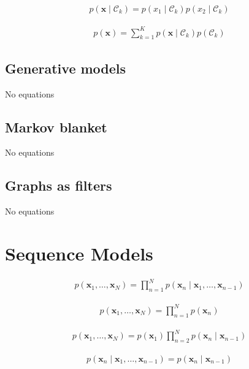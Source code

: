 \documentclass{article}
\begin{document}
\begin{align*}
p\left(\mathbf{x} \mid \mathcal{C}_{k}\right)=p\left(x_{1} \mid \mathcal{C}_{k}\right) p\left(x_{2} \mid \mathcal{C}_{k}\right) 
\tag{11.40}
\end{align*}

\begin{align*}
p(\mathbf{x})=\sum_{k=1}^{K} p\left(\mathbf{x} \mid \mathcal{C}_{k}\right) p\left(\mathcal{C}_{k}\right) 
\tag{11.41}
\end{align*}

\subsection{Generative models}

No equations

\subsection{Markov blanket}

No equations

\subsection{Graphs as filters}

No equations

\section{Sequence Models}

\begin{align*}
p\left(\mathbf{x}_{1}, \ldots, \mathbf{x}_{N}\right)=\prod_{n=1}^{N} p\left(\mathbf{x}_{n} \mid \mathbf{x}_{1}, \ldots, \mathbf{x}_{n-1}\right) 
\tag{11.42}
\end{align*}

\begin{align*}
p\left(\mathbf{x}_{1}, \ldots, \mathbf{x}_{N}\right)=\prod_{n=1}^{N} p\left(\mathbf{x}_{n}\right) 
\tag{11.43}
\end{align*}

\begin{align*}
p\left(\mathbf{x}_{1}, \ldots, \mathbf{x}_{N}\right)=p\left(\mathbf{x}_{1}\right) \prod_{n=2}^{N} p\left(\mathbf{x}_{n} \mid \mathbf{x}_{n-1}\right) 
\tag{11.44}
\end{align*}

\begin{align*}
p\left(\mathbf{x}_{n} \mid \mathbf{x}_{1}, \ldots, \mathbf{x}_{n-1}\right)=p\left(\mathbf{x}_{n} \mid \mathbf{x}_{n-1}\right) 
\tag{11.45}
\end{align*}
\end{document}
